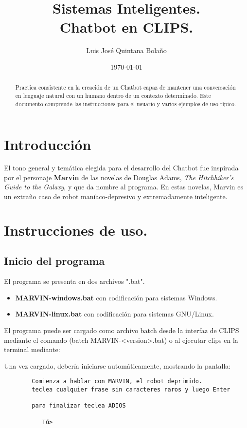 \documentclass[a4paper]{article}
\title{Sistemas Inteligentes.\\ Chatbot en CLIPS. }
\author{Luis José Quintana Bolaño}
\date{\today}
\begin{document}
	\maketitle
	\begin{abstract}
	    Practica consistente en la creación de un Chatbot capaz de mantener una conversación en lenguaje natural con un humano dentro de un contexto determinado. Este documento comprende las instrucciones para el usuario y varios ejemplos de uso típico.
  	\end{abstract}
  	\section{Introducción}
  		El tono general y temática elegida para el desarrollo del Chatbot fue inspirada por el personaje {\bf Marvin} de las novelas de Douglas Adams, \emph{The Hitchhiker's Guide to the Galaxy}, y que da nombre al programa. En estas novelas, Marvin es un extraño caso de robot maníaco-depresivo y extremadamente inteligente.
	\section{Instrucciones de uso.}
		\subsection{Inicio del programa}
		El programa se presenta en dos archivos ".bat". 
		\begin{itemize}
			\item {\bf MARVIN-windows.bat} con codificación para sistemas Windows.
			\item {\bf MARVIN-linux.bat} con codificación para sistemas GNU/Linux.
		\end{itemize}
		El programa puede ser cargado como archivo batch desde la interfaz de CLIPS mediante el comando (batch MARVIN-<version>.bat) o al ejecutar clips en la terminal mediante:
		\begin{listing}[style=consola, numbers=none]
:~$ clips -f MARVIN-linux.bat
		\end{listing}%
		
		Una vez cargado, debería iniciarse automáticamente, mostrando la pantalla:
		\begin{verbatim}
        Comienza a hablar con MARVIN, el robot deprimido.
        teclea cualquier frase sin caracteres raros y luego Enter

        para finalizar teclea ADIOS 

           Tú>
		\end{verbatim}
		
\end{document}
